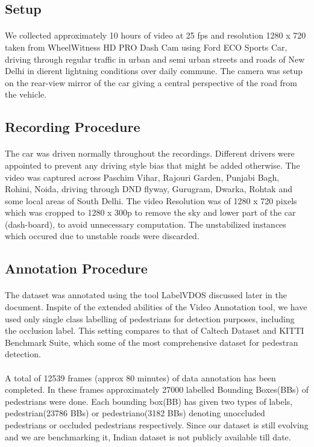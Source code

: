 \subsection{Setup}
\paragraph{}We collected approximately 10 hours of video at 25 fps and resolution 1280 x 720 taken from WheelWitness HD PRO Dash Cam using Ford ECO Sports Car, driving through regular traffic in urban and semi urban streets and roads of New Delhi in dierent lightning conditions over daily commune. The camera was setup on the rear-view mirror of the car giving a central perspective of the road from the vehicle.  

\subsection{Recording Procedure}
\paragraph{} The car was driven normally throughout the recordings. Different drivers were appointed to prevent any driving style bias that might be added otherwise. The video was captured across Paschim Vihar, Rajouri Garden, Punjabi Bagh, Rohini, Noida, driving through DND flyway, Gurugram, Dwarka, Rohtak and some local areas of South Delhi. The video Resolution was of 1280 x 720 pixels which was cropped to 1280 x 300p to remove the sky and lower part of the car (dash-board), to avoid unnecessary computation. The unstabilized instances which occured due to unstable roads were discarded.

\subsection{Annotation Procedure}
\paragraph{} The dataset was annotated using the tool LabelVDOS discussed later in the document. Inspite of the extended abilities of the Video Annotation tool, we have used only single class labelling of pedestrians for detection purposes, including the occlusion label. This setting compares to that of Caltech Dataset and KITTI Benchmark Suite, which some of the most comprehensive dataset for pedestran detection.

\paragraph{} A total of 12539 frames (approx 80 minutes) of data annotation has been completed. In these frames approximately 27000 labelled Bounding Boxes(BBs) of pedestrians were done. Each bounding box(BB) has given two types of labels, pedestrian(23786 BBs) or pedestriano(3182 BBs) denoting unoccluded pedestrians or occluded pedestrians respectively. Since our dataset is still evolving and we are benchmarking it, Indian dataset is not publicly available till date.

